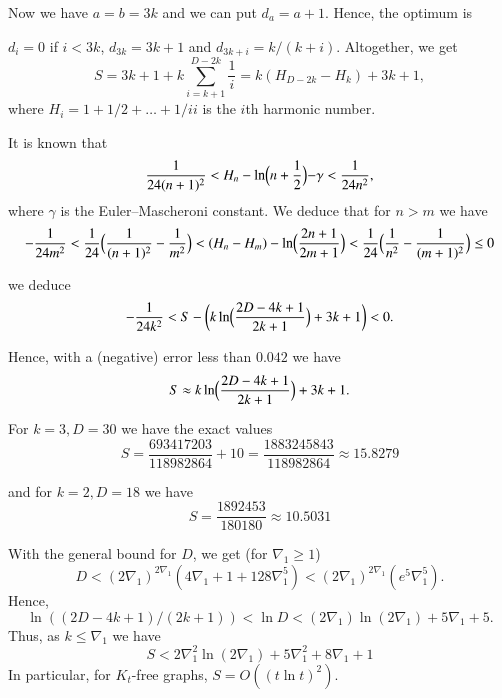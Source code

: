 Now we have $a=b=3k$ and we can put $d_a=a+1$. 
Hence,  the optimum is

$d_i=0$ if $i<3k$, $d_{3k}=3k+1$ and $d_{3k+i}=k/(k+i)$.
Altogether, we get
\[
S=3k+1+k\sum_{i=k+1}^{D-2k}\frac{1}{i}=k(H_{D-2k}-H_k)+3k+1,
\]
where $H_i=1+1/2+\dots+1/ii$ is the $i$th harmonic number.

It is known \cite{DeTemple1991} that 
\[
\frac{1}{24(n+1)^2}<H_n-\ln \Bigl(n+\frac12\Bigl)-\gamma<\frac{1}{24n^2},
\]
where $\gamma$ is the Euler--Mascheroni constant.
We deduce that for $n>m$ we have
\[
-\frac{1}{24m^2}<\frac{1}{24}\Bigl(\frac{1}{(n+1)^2}-\frac{1}{m^2}\Bigr)<(H_n-H_m)-\ln \Bigl(\frac{2n+1}{2m+1}\Bigr)<\frac{1}{24}\Bigl(\frac{1}{n^2}-\frac{1}{(m+1)^2}\Bigr)\le 0
\]

 we deduce
 \[
 -\frac{1}{24k^2}<S-\biggl(
 k\ln\Bigl(\frac{2D-4k+1}{2k+1}\Bigr)+3k+1\biggr)<0.
 \]
 
 Hence, with a (negative) error less than $0.042$ we have
 \[
 S\approx k\ln\Bigl(\frac{2D-4k+1}{2k+1}\Bigr)+3k+1.
 \]

For $k=3,D=30$ we have the exact values
\[
S=\frac{693417203}{118982864}+10=\frac{1883245843}{118982864}\approx 15.8279
\]

and for $k=2,D=18$ we have
\[
S=\frac{1892453}{180180}\approx 10.5031
\]


With the general bound for $D$, we get (for $\nabla_1\ge 1$)
\[
D<(2\nabla_1)^{2\nabla_1}(4\nabla_1+1+128\nabla_1^5)<(2\nabla_1)^{2\nabla_1}(e^5\nabla_1^5).
\]
Hence,
\[
\ln((2D-4k+1)/(2k+1))<\ln D<(2\nabla_1)\ln(2\nabla_1)+5\nabla_1+5.
\]
Thus, as $k\le\nabla_1$ we have
\[
S< 2\nabla_1^2\ln (2\nabla_1)+5\nabla_1^2+8\nabla_1+1
\]
In particular, for $K_t$-free graphs, $S=O((t\ln t)^2)$.
